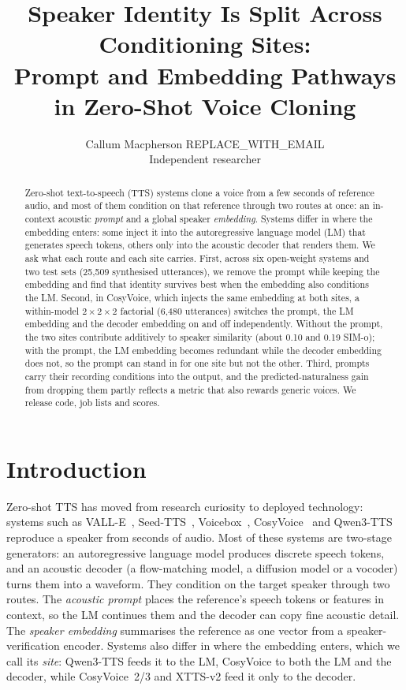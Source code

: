 \documentclass[10pt]{article}
\title{Speaker Identity Is Split Across Conditioning Sites:\\
Prompt and Embedding Pathways in Zero-Shot Voice Cloning}
\author{\name Callum Macpherson \email REPLACE\_WITH\_EMAIL \\
      \addr Independent researcher}
\begin{document}
\maketitle

\begin{abstract}
Zero-shot text-to-speech (TTS) systems clone a voice from a few seconds of reference audio, and most of them condition on that reference through two routes at once: an in-context acoustic \emph{prompt} and a global speaker \emph{embedding}. Systems differ in where the embedding enters: some inject it into the autoregressive language model (LM) that generates speech tokens, others only into the acoustic decoder that renders them. We ask what each route and each site carries. First, across six open-weight systems and two test sets (25{,}509 synthesised utterances), we remove the prompt while keeping the embedding and find that identity survives best when the embedding also conditions the LM. Second, in CosyVoice, which injects the same embedding at both sites, a within-model $2{\times}2{\times}2$ factorial (6{,}480 utterances) switches the prompt, the LM embedding and the decoder embedding on and off independently. Without the prompt, the two sites contribute additively to speaker similarity (about 0.10 and 0.19 SIM-o); with the prompt, the LM embedding becomes redundant while the decoder embedding does not, so the prompt can stand in for one site but not the other. Third, prompts carry their recording conditions into the output, and the predicted-naturalness gain from dropping them partly reflects a metric that also rewards generic voices. We release code, job lists and scores.
\end{abstract}

\section{Introduction}
\label{sec:intro}

Zero-shot TTS has moved from research curiosity to deployed technology: systems such as VALL-E~\citep{valle}, Seed-TTS~\citep{seedtts}, Voicebox~\citep{voicebox}, CosyVoice~\citep{cosyvoice,cosyvoice2,cosyvoice3} and Qwen3-TTS~\citep{qwen3tts} reproduce a speaker from seconds of audio.
Most of these systems are two-stage generators: an autoregressive language model produces discrete speech tokens, and an acoustic decoder (a flow-matching model, a diffusion model or a vocoder) turns them into a waveform.
They condition on the target speaker through two routes.
The \emph{acoustic prompt} places the reference's speech tokens or features in context, so the LM continues them and the decoder can copy fine acoustic detail.
The \emph{speaker embedding} summarises the reference as one vector from a speaker-verification encoder.
Systems also differ in where the embedding enters, which we call its \emph{site}: Qwen3-TTS feeds it to the LM, CosyVoice to both the LM and the decoder, while CosyVoice~2/3 and XTTS-v2 feed it only to the decoder.
\end{document}
